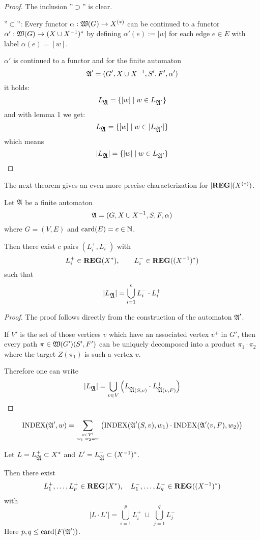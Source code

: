 \begin{proof}
 The inclusion ''$\supset$'' is clear.
 
 ''$\subset$'': Every functor $\alpha : \mbox{$\mathfrak{W}({G})$} \to \mbox{${X}^{(*)}$}$ can be
 continued to a functor $\alpha' : \mbox{$\mathfrak{W}({G})$} \to
 (X \cup {X}^{-1})^*$ by defining $\alpha'(e) := |w|$ for each edge $e \in E$ with label $\alpha(e) =
 [w]$.
 
 $\alpha'$ is continued to a functor and for the finite automaton
 \[ \mbox{$\mathfrak{A}$}' = (G', X \cup {X}^{-1}, S', F', \alpha') \]
 it holds:
 \[ L_{\mbox{$\mathfrak{A}$}} = \mbox{$\{[w] \mid w \in L_{\mbox{$\mathfrak{A}$}'}\}$} \]
 and with lemma 1 we get:
 \[ L_{\mbox{$\mathfrak{A}$}} = \mbox{$\{[w] \mid w \in |L_{\mbox{$\mathfrak{A}$}'}|\}$} \]
 which means
 \[ |L_{\mbox{$\mathfrak{A}$}}| = \mbox{$\{|w| \mid w \in L_{\mbox{$\mathfrak{A}$}'}\}$} \]
\end{proof}

The next theorem gives an even more precise characterization for
$|\mbox{{\bf REG}}|(\mbox{${X}^{(*)}$})$.

\begin{theorem}
Let $\mbox{$\mathfrak{A}$}$ be a finite automaton
\[ \mbox{$\mathfrak{A}$} = (G, X \cup {X}^{-1}, S, F, \alpha) \]
where $G = (V, E)$ and $\mathrm{card}({E}) = c \in \mathbb{N}$.

Then there exist $c$ pairs $(L_i^+, L_i^-)$ with 
\[ L_i^+ \in \mbox{{\bf REG}}(X^*),\qquad L_i^- \in \mbox{{\bf REG}}((X^{-1})^*) \]
such that
\[ |L_{\mbox{$\mathfrak{A}$}}| = \bigcup_{i=1}^c L_i^- \cdot L_i^+ \]
\end{theorem}

\begin{proof}
The proof follows directly from the construction of the automaton $\mbox{$\mathfrak{A}$}'$.

If $V'$ is the set of those vertices $v$ which have an associated vertex $v^+$
in $G'$, then every path $\pi \in \mbox{$\mathfrak{W}({G'})$}(S', F')$ can be uniquely
decomposed into a product $\pi_1 \cdot \pi_2$ where the target $Z(\pi_1)$ is
such a vertex $v$.

Therefore one can write
\[ |L_{\mbox{$\mathfrak{A}$}}| = \bigcup_{v \in V} \left( L_{\mbox{$\mathfrak{A}$}(S, v)}^- 
\cdot L_{\mbox{$\mathfrak{A}$}(v, F)}^+ \right)
\]
\end{proof}

\begin{corollary}
\[ \mathrm{INDEX}(\mbox{$\mathfrak{A}$}', w) = \sum_{v \in V' \atop w_1 \cdot w_2 = w} \left(
\mathrm{INDEX}(\mbox{$\mathfrak{A}$}'(S, v), w_1) \cdot \mathrm{INDEX}(\mbox{$\mathfrak{A}$}'(v, F), w_2)
\right) \]
\end{corollary}

\bigskip
\begin{lemma}
Let $L = L_{\mbox{$\mathfrak{A}$}}^+ \subset X^*$ and $L' = L_{\mbox{$\mathfrak{A}$}}^- \subset (X^{-1})^*$.

Then there exist 
\[ L_1^+, \ldots, L_p^+ \in \mbox{{\bf REG}}(X^*),\quad L_1^-, \ldots, L_q^- \in
\mbox{{\bf REG}}((X^{-1})^*) \]
with
\[ |L \cdot L'| = \bigcup_{i=1}^{p} L_i^+ \ \cup\ \bigcup_{j=1}^{q} L_j^- \]
Here $p, q \leq \mathrm{card}({F(\mbox{$\mathfrak{A'}$})})$.
\end{lemma}


